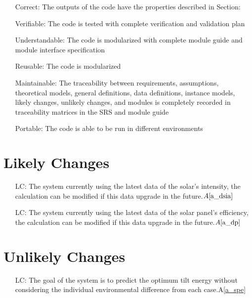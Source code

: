 \documentclass[12pt]{article}
\newcommand{\aref}[1]{A\ref{#1}}
\newcounter{lcnum} %
\begin{document}
\noindent\begin{itemize}
\item[ ]Correct: The outputs of the code have the properties described in Section: 
\item[ ]Verifiable: The code is tested with complete verification and validation plan
\item[ ]Understandable: The code is modularized with complete module guide and module interface specification
\item[ ]Reusable: The code is modularized
\item[ ]Maintainable: The traceability between requirements, assumptions, theoretical models, general definitions, data definitions, instance models, likely changes, unlikely changes, and modules
is completely recorded in traceability matrices in the SRS and module guide
\item[ ]Portable: The code is able to be run in different environments
\end{itemize}

\section{Likely Changes}    

\noindent \begin{itemize}

\item[LC\refstepcounter{lcnum}\thelcnum\label{LC_SI}:] The system currently using the latest data of the solar's intensity, the calculation can be modified if this data upgrade in the future.$\aref{a_dsia}$

\item[LC\refstepcounter{lcnum}\thelcnum\label{LC_P}:] The system currently using the latest data of the solar panel's efficiency, the calculation can be modified if this data upgrade in the future.$\aref{a_dp}$

\end{itemize}

\section{Unlikely Changes}    

\noindent \begin{itemize}

\item[LC\refstepcounter{lcnum}\thelcnum\label{LC_G}:] The goal of the system is to predict the optimum tilt energy without considering the individual environmental difference from each case.\aref{a_spe}

\end{itemize}
\end{document}
